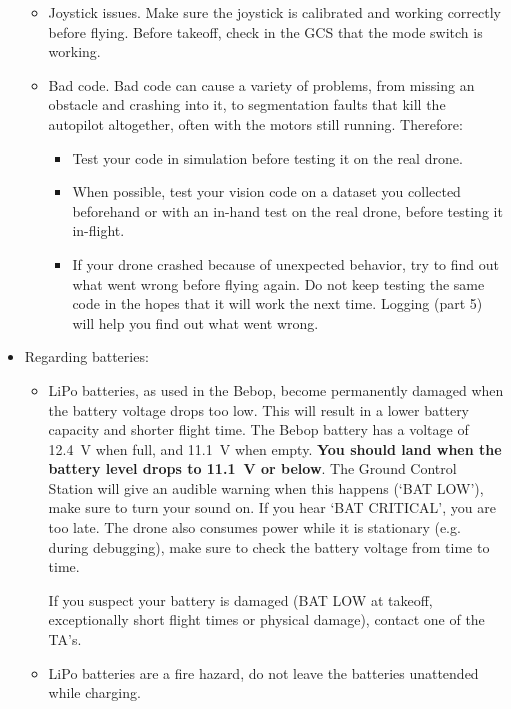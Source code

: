 \documentclass{article}
\begin{document}
\begin{itemize}
\begin{itemize}
\begin{itemize}
\end{itemize}
\item Joystick issues. Make sure the joystick is calibrated and working correctly before flying. Before takeoff, check in the GCS that the mode switch is working.
\item Bad code. Bad code can cause a variety of problems, from missing an obstacle and crashing into it, to segmentation faults that kill the autopilot altogether, often with the motors still running. Therefore:
\begin{itemize}
\item Test your code in simulation before testing it on the real drone.
\item When possible, test your vision code on a dataset you collected beforehand or with an in-hand test on the real drone, before testing it in-flight.
\item If your drone crashed because of unexpected behavior, try to find out what went wrong before flying again. Do not keep testing the same code in the hopes that it will work the next time. Logging (part 5) will help you find out what went wrong.
\end{itemize}
\end{itemize}
\item Regarding batteries:
\begin{itemize}
\item{LiPo batteries, as used in the Bebop, become permanently damaged when the battery voltage drops too low. This will result in a lower battery capacity and shorter flight time. The Bebop battery has a voltage of 12.4~V when full, and 11.1~V when empty. \textbf{You should land when the battery level drops to 11.1~V or below}. The Ground Control Station will give an audible warning when this happens (`BAT LOW'), make sure to turn your sound on. If you hear `BAT CRITICAL', you are too late. The drone also consumes power while it is stationary (e.g. during debugging), make sure to check the battery voltage from time to time.

If you suspect your battery is damaged (BAT LOW at takeoff, exceptionally short flight times or physical damage), contact one of the TA's.}

\item{LiPo batteries are a fire hazard, do not leave the batteries unattended while charging.}
\end{itemize}
\end{itemize}
\end{document}
